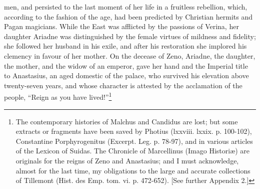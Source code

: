 men, and persisted to the last moment of her life in a fruitless rebellion, which, according to the fashion of the age, had been predicted by Christian hermits and Pagan magicians. While the East was afflicted by the passions of Verina, her daughter Ariadne was distinguished by the female virtues of mildness and fidelity; she followed her husband in his exile, and after his restoration she implored his clemency in favour of her mother. On the decease of Zeno, Ariadne, the daughter, the mother, and the widow of an emperor, gave her hand and the Imperial title to Anastasius, an aged domestic of the palace, who survived his elevation above twenty-seven years, and whose character is attested by the acclamation of the people, \texthebrew{“}Reign as you have lived!\texthebrew{}”\footnote{The contemporary histories of Malchus and Candidus are lost; but some extracts or fragments have been saved by Photius (lxxviii. lxxix. p. 100-102), Constantine Porphyrogenitus (Excerpt. Leg. p. 78-97), and in various articles of the Lexicon of Suidas. The Chronicle of Marcellinus (Imago Historiæ) are originals for the reigns of Zeno and Anastasius; and I must acknowledge, almost for the last time, my obligations to the large and accurate collections of Tillemont (Hist. des Emp. tom. vi. p. 472-652). [See further Appendix 2.]}

